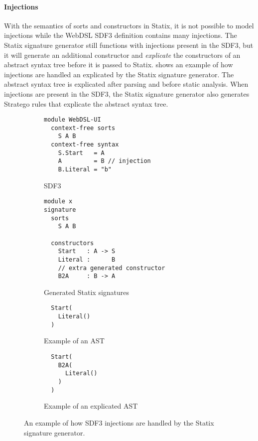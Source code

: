       \paragraph{Injections} With the semantics of sorts and constructors in Statix, it is not possible to model injections while the WebDSL SDF3 definition contains many injections. The Statix signature generator still functions with injections present in the SDF3, but it will generate an additional constructor and \textit{explicate} the constructors of an abstract syntax tree before it is passed to Statix.  shows an example of how injections are handled an explicated by the Statix signature generator. The abstract syntax tree is explicated after parsing and before static analysis. When injections are present in the SDF3, the Statix signature generator also generates Stratego rules that explicate the abstract syntax tree.

      \begin{figure}
        \begin{subfigure}[b]{0.5\textwidth}
          \begin{verbatim}
module WebDSL-UI
  context-free sorts
    S A B
  context-free syntax
    S.Start   = A
    A         = B // injection
    B.Literal = "b"
          \end{verbatim}
          \caption{\label{fig:sdf3-statix-explication-sdf3}SDF3}
        \end{subfigure}
        \begin{subfigure}[b]{0.5\textwidth}
          \begin{verbatim}
module x
signature
  sorts
    S A B
  
  constructors
    Start   : A -> S
    Literal :      B
    // extra generated constructor
    B2A     : B -> A
          \end{verbatim}
          \caption{\label{fig:sdf3-statix-explication-statix}Generated Statix signatures}
        \end{subfigure}
        \begin{subfigure}[b]{0.5\textwidth}
          \begin{verbatim}
  Start(
    Literal()
  )
          \end{verbatim}
          \caption{\label{fig:sdf3-statix-explication-ast}Example of an AST}
        \end{subfigure}
        \begin{subfigure}[b]{0.5\textwidth}
          \begin{verbatim}
  Start(
    B2A(
      Literal()
    )
  )
          \end{verbatim}
          \caption{\label{fig:sdf3-statix-explication-explicated}Example of an explicated AST}
        \end{subfigure}
        \caption{\label{fig:sdf3-statix-explication}An example of how SDF3 injections are handled by the Statix signature generator.}
      \end{figure}

